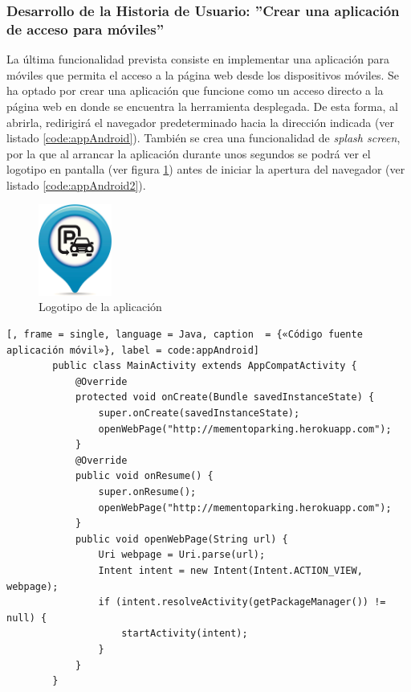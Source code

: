 	\subsubsection{Desarrollo de la Historia de Usuario: ''Crear una aplicación de acceso para móviles''}
La última funcionalidad prevista consiste en implementar una aplicación para móviles que permita el acceso a la página web desde los dispositivos móviles. Se ha optado por crear una aplicación que funcione como un acceso directo a la página web en donde se encuentra la herramienta desplegada. De esta forma, al abrirla, redirigirá el navegador predeterminado hacia la dirección indicada (ver listado \ref{code:appAndroid}). También se crea una funcionalidad de \textit{splash screen}, por la que al arrancar la aplicación durante unos segundos se podrá ver el logotipo en pantalla (ver figura \ref{fig:app-Android2}) antes de iniciar la apertura del navegador (ver listado \ref{code:appAndroid2}).

	\begin{figure}[h!]
		\centering
		\includegraphics[height=3cm, fbox={\fboxrule} 4mm]{images/05-resultados/26-app_Android2.jpg}
		\caption{Logotipo de la aplicación}
		\label{fig:app-Android2}
	\end{figure}

	\begin{lstlisting}[, frame = single, language = Java, caption  = {«Código fuente aplicación móvil»}, label = code:appAndroid]
		public class MainActivity extends AppCompatActivity {
		    @Override
		    protected void onCreate(Bundle savedInstanceState) {
		        super.onCreate(savedInstanceState);
		        openWebPage("http://mementoparking.herokuapp.com");
		    }
		    @Override
		    public void onResume() {
		        super.onResume();
		        openWebPage("http://mementoparking.herokuapp.com");
		    }
		    public void openWebPage(String url) {
		        Uri webpage = Uri.parse(url);
		        Intent intent = new Intent(Intent.ACTION_VIEW, webpage);
		        if (intent.resolveActivity(getPackageManager()) != null) {
		            startActivity(intent);
		        }
		    }
		}
	\end{lstlisting}
	
